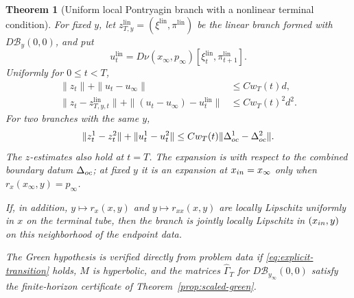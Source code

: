 \documentclass[twocolumn,nameyear,amsthm]{autart}
\newcommand{\B}{\mathcal B}
\newcommand{\lin}{\mathrm{lin}}
\newcommand{\xinf}{x_\infty}
\newcommand{\uinf}{u_\infty}
\newcommand{\pinf}{p_\infty}
\numberwithin{equation}{section}
\newtheorem{theorem}{Theorem}[section]
\begin{document}
\begin{theorem}[Uniform local Pontryagin branch with a nonlinear terminal condition]
For fixed $y$, let $z^{\lin}_{T,y}=(\xi^{\lin},\pi^{\lin})$ be the linear
branch formed with $D\B_y(0,0)$, and put
\[
 u_t^{\lin}=D\nu(\xinf,\pinf)
       [\xi_t^{\lin},\pi_{t+1}^{\lin}].
\]
Uniformly for $0\le t<T$,
\begin{align}
 \|z_t\|+\|u_t-\uinf\|&\le Cw_T(t)d,\label{eq:main-size}\\
 \|z_t-z^{\lin}_{T,y,t}\|+
 \|(u_t-\uinf)-u_t^{\lin}\|&\le Cw_T(t)^2d^2.
 \label{eq:main-first}
\end{align}
For two branches with the same $y$,
\begin{equation}\label{eq:main-lip}
 \|z_t^1-z_t^2\|+\|u_t^1-u_t^2\|
 \le Cw_T(t)\|\Delta_{\rm oc}^1-\Delta_{\rm oc}^2\|.
\end{equation}
The $z$-estimates also hold at $t=T$.  The expansion is with respect to the
combined boundary datum $\Delta_{\rm oc}$; at fixed $y$ it is an expansion at
$x_{\rm in}=\xinf$ only when $r_x(\xinf,y)=\pinf$.

If, in addition,
$y\mapsto r_x(x,y)$ and $y\mapsto r_{xx}(x,y)$ are locally Lipschitz uniformly
in $x$ on the terminal tube, then the branch is jointly locally Lipschitz in
$(x_{\rm in},y)$ on this neighborhood of the endpoint data.

The Green hypothesis is verified directly from problem data if
\eqref{eq:explicit-transition} holds, $M$ is hyperbolic, and the matrices
$\widehat\Gamma_T$ for $D\B_{y_\infty}(0,0)$ satisfy the finite-horizon
certificate of Theorem~\ref{prop:scaled-green}.
\end{theorem}
\end{document}
